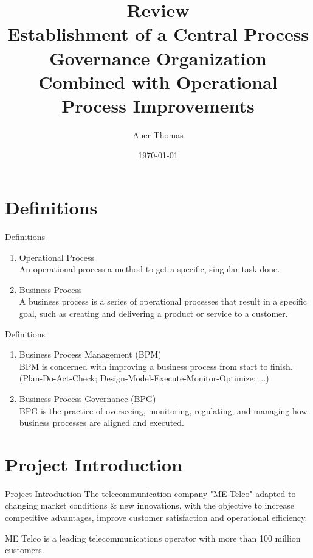 \documentclass{beamer}
\title{\textbf{Review}\\Establishment of a Central Process Governance Organization Combined with Operational Process Improvements}
\author{Auer Thomas}
\date{\today}
\institute{University of Klagenfurt}
\begin{document}
\frame{\titlepage}

\begin{frame}
    \tableofcontents
\end{frame}



\section{Definitions}
\begin{frame}{Definitions}
    \begin{enumerate}[$\circ$]
        \item Operational Process\\An operational process a method to get a specific, singular task done. 
        \item Business Process\\A business process is a series of operational processes that result in a specific goal, such as creating and delivering a product or service to a customer.
    \end{enumerate}    
\end{frame}

\begin{frame}{Definitions}
    \begin{enumerate}[$\circ$]
        \item Business Process Management (BPM)\\BPM is concerned with improving a business process from start to finish. (Plan-Do-Act-Check; Design-Model-Execute-Monitor-Optimize; ...)
        \item Business Process Governance (BPG)\\BPG is the practice of overseeing, monitoring, regulating, and managing how business processes are aligned and executed.
    \end{enumerate}    
\end{frame}







\section{Project Introduction}
\begin{frame}{Project Introduction}
    The telecommunication company "ME Telco" adapted to changing market conditions \& new innovations,
    with the objective to increase competitive advantages, improve customer satisfaction and operational efficiency.

    \vspace{1em}

    ME Telco is a leading telecommunications operator with more than 100 million customers.
\end{frame}
\end{document}
